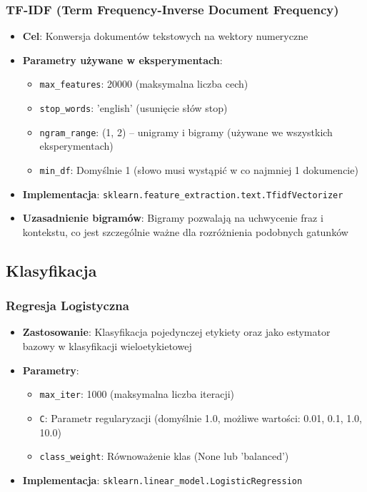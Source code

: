 \documentclass[12pt,a4paper]{article}
\begin{document}
\subsubsection{TF-IDF (Term Frequency-Inverse Document Frequency)}
\begin{itemize}
    \item \textbf{Cel}: Konwersja dokumentów tekstowych na wektory numeryczne
    \item \textbf{Parametry używane w eksperymentach}:
    \begin{itemize}
        \item \texttt{max\_features}: 20000 (maksymalna liczba cech)
        \item \texttt{stop\_words}: 'english' (usunięcie słów stop)
        \item \texttt{ngram\_range}: (1, 2) -- unigramy i bigramy (używane we wszystkich eksperymentach)
        \item \texttt{min\_df}: Domyślnie 1 (słowo musi wystąpić w co najmniej 1 dokumencie)
    \end{itemize}
    \item \textbf{Implementacja}: \texttt{sklearn.feature\_extraction.text.TfidfVectorizer}
    \item \textbf{Uzasadnienie bigramów}: Bigramy pozwalają na uchwycenie fraz i kontekstu, co jest szczególnie ważne dla rozróżnienia podobnych gatunków
\end{itemize}

\subsection{Klasyfikacja}

\subsubsection{Regresja Logistyczna}
\begin{itemize}
    \item \textbf{Zastosowanie}: Klasyfikacja pojedynczej etykiety oraz jako estymator bazowy w klasyfikacji wieloetykietowej
    \item \textbf{Parametry}:
    \begin{itemize}
        \item \texttt{max\_iter}: 1000 (maksymalna liczba iteracji)
        \item \texttt{C}: Parametr regularyzacji (domyślnie 1.0, możliwe wartości: 0.01, 0.1, 1.0, 10.0)
        \item \texttt{class\_weight}: Równoważenie klas (None lub 'balanced')
    \end{itemize}
    \item \textbf{Implementacja}: \texttt{sklearn.linear\_model.LogisticRegression}
\end{itemize}
\end{document}
